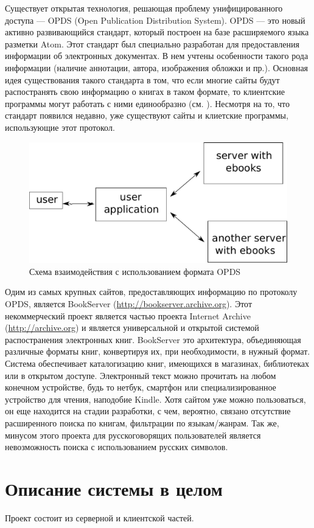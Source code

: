 Существует открытая технология, решающая проблему унифицированного доступа  --- OPDS (Open Publication Distribution System).
OPDS --- это новый активно развивающийся стандарт, который построен на базе расширяемого языка разметки Atom. Этот стандарт был специально разработан для предоставления информации об электронных документах. В нем учтены особенности такого рода информации (наличие аннотации, автора, изображения обложки и пр.).
Основная идея существования такого стандарта в том, что если многие сайты будут распостранять свою информацию о книгах в таком формате, то клиентские программы могут работать с ними единообразно (см. ). Несмотря на то, что стандарт появился недавно, уже существуют сайты и клиетские программы, использующие этот протокол. 

\begin{figure}
\centering
\includegraphics[width=.5\textwidth]{scheme}
\caption{Схема взаимодействия с использованием формата OPDS}\label{fig:scheme}
\end{figure}

Одим из самых крупных сайтов, предоставляющих информацию по протоколу OPDS, является BookServer (\url{http://bookserver.archive.org}).
Этот некоммерческий проект является частью проекта Internet Archive (\url{http://archive.org}) и является универсальной и открытой системой распостранения электронных книг. BookServer это архитектура, объединяющая различные форматы книг, конвертируя их, при необходимости, в нужный формат. Система обеспечивает каталогизацию книг, имеющихся в магазинах, библиотеках или в открытом доступе. Электронный текст можно прочитать на любом конечном устройстве, будь то нетбук, смартфон или специализированное устройство для чтения, наподобие Kindle. Хотя сайтом уже можно пользоваться, он еще находится на стадии разработки, с чем, вероятно, связано отсутствие расширенного поиска по книгам, фильтрации по языкам/жанрам. Так же, минусом этого проекта для русскоговорящих пользователей является невозможность поиска с использованием русских символов.

\section{Описание системы в целом}
Проект состоит из серверной и клиентской частей.

